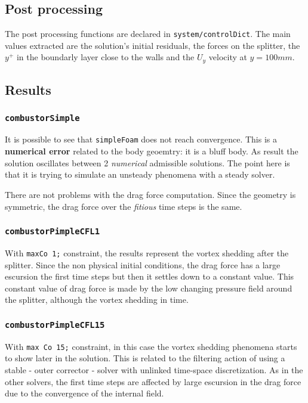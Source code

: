 \subsection{Post processing}
The post processing functions are declared in \verb|system/controlDict|. The main values extracted are the solution's initial residuals, the forces on the splitter, the $y^+$ in the boundarly layer close to the walls and the $U_y$ velocity at $y = 100 mm$. 

\subsection{Results}
\cprotect\subsubsection{\verb|combustorSimple|}
It is possible to see that \verb|simpleFoam| does not reach convergence. This is a \textbf{numerical error} related to the body geoemtry: it is a bluff body. As result the solution oscillates between 2 \textit{numerical} admissible solutions. The point here is that it is trying to simulate an unsteady phenomena with a steady solver. 

There are not problems with the drag force computation. Since the geometry is symmetric, the drag force over the \textit{fitious} time steps is the same. 

\cprotect\subsubsection{\verb|combustorPimpleCFL1|}
With \verb|maxCo 1;| constraint, the results represent the vortex shedding after the splitter. Since the non physical initial conditions, the drag force has a large escursion the first time steps but then it settles down to a constant value. This constant value of drag force is made by the low changing pressure field around the splitter, although the vortex shedding in time. 

\cprotect\subsubsection{\verb|combustorPimpleCFL15|}
With \verb|max Co 15;| constraint, in this case the vortex shedding phenomena starts to show later in the solution. This is related to the filtering action of using a stable - outer corrector - solver with unlinked time-space discretization. As in the other solvers, the first time steps are affected by large escursion in the drag force due to the convergence of the internal field.  

